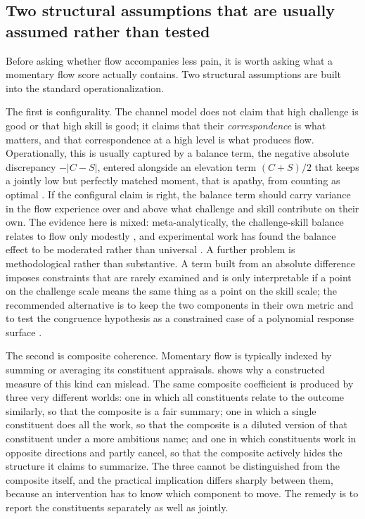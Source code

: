 \documentclass[11pt,a4paper]{article}
\begin{document}
\subsection{Two structural assumptions that are usually assumed rather than tested}
Before asking whether flow accompanies less pain, it is worth asking what a momentary flow score
actually contains. Two structural assumptions are built into the standard operationalization.

The first is configurality. The channel model does not claim that high challenge is good
or that high skill is good; it claims that their \emph{correspondence} is what matters, and that
correspondence at a high level is what produces flow. Operationally, this is usually captured by a
balance term, the negative absolute discrepancy $-|C-S|$, entered alongside an elevation term
$(C+S)/2$ that keeps a jointly low but perfectly matched moment, that is apathy, from counting as
optimal \citep{moneta1996effect}. If the configural claim is right, the balance term should carry
variance in the flow experience over and above what challenge and skill contribute on their own.
The evidence here is mixed: meta-analytically, the challenge-skill balance relates to flow only
modestly \citep{fong2015challenge}, and experimental work has found the balance effect to be
moderated rather than universal \citep{engeser2008flow}. A further problem is methodological
rather than substantive. A term built from an absolute difference imposes constraints that are
rarely examined and is only interpretable if a point on the challenge scale means the same thing
as a point on the skill scale; the recommended alternative is to keep the two components in their
own metric and to test the congruence hypothesis as a constrained case of a polynomial response
surface \citep{edwards1993polynomial,edwards1994congruence}.

The second is composite coherence. Momentary flow is typically indexed by summing or
averaging its constituent appraisals. \citet{vanderweele2022constructed} shows why a constructed
measure of this kind can mislead. The same composite coefficient is produced by three very
different worlds: one in which all constituents relate to the outcome similarly, so that the
composite is a fair summary; one in which a single constituent does all the work, so that the
composite is a diluted version of that constituent under a more ambitious name; and one in which
constituents work in opposite directions and partly cancel, so that the composite actively hides
the structure it claims to summarize. The three cannot be distinguished from the composite itself,
and the practical implication differs sharply between them, because an intervention has to know
which component to move. The remedy is to report the constituents separately as well as jointly.
\end{document}
